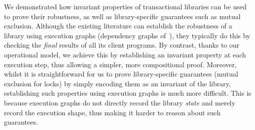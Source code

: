 We demonstrated how invariant properties of transactional libraries can be used to prove their robustness, as well as  library-specific guarantees such as mutual exclusion. 
Although the existing literature can establish the robustness of a library using execution graphs (\eg dependency graphs of~\cite{adya}), they typically do this by checking the \emph{final} results of all its client programs.
By contrast, thanks to our operational model, we achieve this by establishing an invariant property at each execution step, thus allowing a simpler, more compositional proof. 
Moreover, whilst it is straightforward for us to prove library-specific guarantees (\eg mutual exclusion for locks) by simply encoding them as an invariant of the library, 
establishing such properties using execution graphs is much more difficult. 
This is because execution graphs do not directly record the library \emph{state} and merely record the execution shape, thus making it harder to reason about such guarantees.


